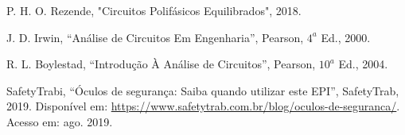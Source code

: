 \documentclass[a4paper,12pt,oneside,openany,table,xcdraw]{article}
\begin{document}
\newpage
\begin{thebibliography}{9} 
    P. H. O. Rezende,
    "Circuitos Polifásicos Equilibrados", 2018.

    J. D. Irwin,
    “Análise de Circuitos Em Engenharia”, Pearson, $4^a$ Ed., 2000.

    R. L. Boylestad,
    “Introdução À Análise de Circuitos”, Pearson, $10^a$ Ed., 2004.

    SafetyTrabi,
    “Óculos de segurança: Saiba quando utilizar este EPI”, SafetyTrab, 2019.
 Disponível em:
 \url{https://www.safetytrab.com.br/blog/oculos-de-seguranca/}. Acesso em: ago. 2019.


\end{thebibliography}
\end{document}
